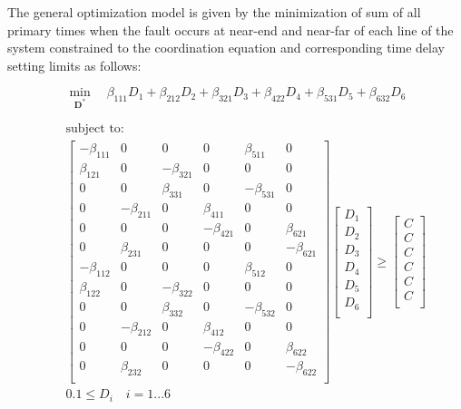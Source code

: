 \documentclass[letterpaper, 10 pt, conference]{IEEEtran}
\begin{document}
  The general optimization model is given by the minimization of sum of all primary times when the fault occurs at near-end and near-far of each line of the system constrained to the coordination equation and corresponding time delay setting limits as follows:

\scriptsize

\begin{equation}\label{Bm}
   \min_{\mathbf{D^*}}\quad \beta_{111}D_1+\beta_{212}D_2+\beta_{321}D_3+\beta_{422}D_4+\beta_{531}D_5+\beta_{632}D_6
\end{equation}


\begin{eqnarray}   \label{opt2}
&&\mbox{subject to}:\\\nonumber
&&  \begin{bmatrix}
    -\beta_{111}    &   0   &   0   &   0   &   \beta_{511} &   0   \\
    \beta_{121} &   0       &   -\beta_{321}    &   0   &   0   &   0   \\
  0&  0       &   \beta_{331} &   0   &   -\beta_{531}    &   0   \\
  0&  -\beta_{211}        &   0   &   \beta_{411} &   0   &   0   \\
0&  0       &   0   &   -\beta_{421}    &   0   &   \beta_{621} \\
0&  \beta_{231}     &   0   &   0   &   0   &   -\beta_{621}    \\
    -\beta_{112}    &   0   &   0   &   0   &   \beta_{512} &   0   \\
    \beta_{122} &   0       &   -\beta_{322}    &   0   &   0   &   0   \\
  0&  0       &   \beta_{332} &   0   &   -\beta_{532}    &   0   \\
  0&  -\beta_{212}        &   0   &   \beta_{412} &   0   &   0   \\
0&  0       &   0   &   -\beta_{422}    &   0   &   \beta_{622} \\
0&  \beta_{232}     &   0   &   0   &   0   &   -\beta_{622}    \\
  \end{bmatrix}
  \begin{bmatrix} \nonumber
  D_1\\D_2\\D_3\\D_4\\D_5\\D_6\\
  \end{bmatrix}
\ge  \begin{bmatrix} \nonumber
  C\\C\\C\\C\\C\\C\\
  \end{bmatrix}\\\nonumber
& & 0.1\le{D_i}\quad i=1...6\\\nonumber
 \end{eqnarray}
\normalsize
\end{document}

